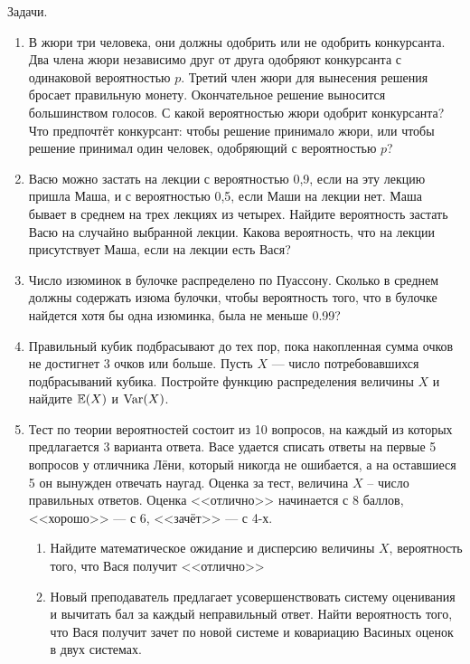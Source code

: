\documentclass[pdftex,12pt,a4paper]{article}
\begin{document}
Задачи.

\begin{enumerate}
\item В жюри три человека, они должны одобрить или не одобрить конкурсанта. Два члена жюри независимо друг от друга одобряют конкурсанта с  одинаковой вероятностью $p$. Третий член жюри для вынесения решения бросает правильную монету. Окончательное решение выносится большинством голосов. С какой вероятностью жюри одобрит конкурсанта? Что предпочтёт конкурсант: чтобы решение принимало жюри, или чтобы решение принимал один человек, одобряющий с вероятностью $p$?

\item Васю можно застать на лекции с вероятностью 0,9, если на эту лекцию пришла Маша, и с вероятностью 0,5, если Маши на лекции нет. Маша бывает в среднем на трех лекциях из четырех. Найдите вероятность застать Васю на случайно выбранной лекции. Какова вероятность, что на лекции присутствует Маша, если на лекции есть Вася?

\item Число изюминок в булочке распределено по Пуассону. Сколько в среднем должны содержать изюма булочки, чтобы вероятность того, что в булочке найдется хотя бы одна изюминка, была не меньше 0.99? 

\item Правильный кубик подбрасывают до тех пор, пока накопленная сумма очков не достигнет 3 очков или больше. Пусть $X$ --- число потребовавшихся подбрасываний кубика. Постройте функцию распределения величины $X$ и найдите $\mathbb{E}(X)$ и $\operatorname{Var}(X)$.

\item Тест по теории вероятностей состоит из 10 вопросов, на каждый из которых предлагается 3 варианта ответа. Васе удается списать ответы на первые 5 вопросов у отличника Лёни, который никогда не ошибается, а на оставшиеся 5 он вынужден отвечать наугад. Оценка за тест, величина $X$ – число правильных ответов. Оценка <<отлично>> начинается с 8 баллов, <<хорошо>> --- с 6, <<зачёт>> --- с 4-х.
\begin{enumerate}
\item Найдите математическое ожидание и дисперсию величины $X$, вероятность того, что Вася получит <<отлично>>
\item Новый преподаватель предлагает усовершенствовать систему оценивания и вычитать бал за каждый неправильный ответ. Найти вероятность того, что Вася получит зачет по новой системе и ковариацию Васиных оценок в двух системах.
\end{enumerate}


\end{enumerate}
\end{document}
